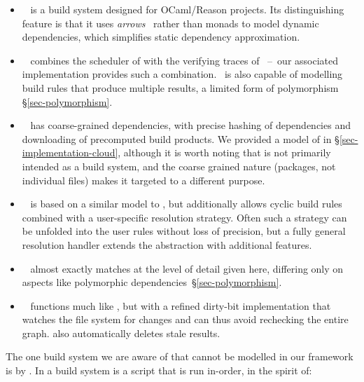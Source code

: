 \begin{itemize}
\item \Dune~\cite{dune} is a build system designed for OCaml/Reason projects.
Its distinguishing feature is that it uses
\emph{arrows}~\cite{hughes2000generalising} rather than monads to model
dynamic dependencies, which simplifies static dependency approximation.

\item \Ninja~\cite{ninja} combines the  scheduler of \Make with
the verifying traces of \Shake~--~our associated implementation provides such a
combination. \Ninja~is also capable of modelling build rules that produce
multiple results, a limited form of polymorphism \S\ref{sec-polymorphism}.

\item \Nix~\cite{dolstra2004nix} has coarse-grained dependencies, with precise
hashing of dependencies and downloading of precomputed build products. We
provided a model of \Nix in \S\ref{sec-implementation-cloud}, although it is
worth noting that \Nix is not primarily intended as a build system, and the
coarse grained nature (packages, not individual files) makes it targeted to a
different purpose.

\item \Pluto~\cite{erdweg2015pluto} is based on a similar model to \Shake, but
additionally allows cyclic build rules combined with a user-specific resolution
strategy. Often such a strategy can be unfolded into the user rules without loss
of precision, but a fully general resolution handler extends the 
abstraction with additional features.

\item \Redo~\cite{redo-idea}\cite{grosskurth2007redo}\cite{redo} almost exactly
matches \Shake at the level of detail given here, differing only on aspects like
polymorphic dependencies~\S\ref{sec-polymorphism}.

\item \Tup~\cite{tup} functions much like \Make, but with a refined dirty-bit
implementation that watches the file system for changes and can thus avoid
rechecking the entire graph. \Tup also automatically deletes stale results.
\end{itemize}

The one build system we are aware of that cannot be modelled in our framework is
\Fabricate by \citet{fabricate}. In \Fabricate a build system is a script that is
run in-order, in the spirit of:


